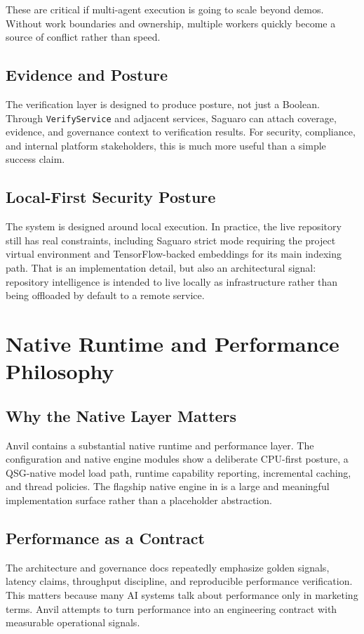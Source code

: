 \documentclass[11pt,a4paper]{article}
\begin{document}
These are critical if multi-agent execution is going to scale beyond demos. Without work boundaries and ownership, multiple workers quickly become a source of conflict rather than speed.

\subsection{Evidence and Posture}
The verification layer is designed to produce posture, not just a Boolean. Through \texttt{VerifyService} and adjacent services, Saguaro can attach coverage, evidence, and governance context to verification results. For security, compliance, and internal platform stakeholders, this is much more useful than a simple success claim.

\subsection{Local-First Security Posture}
The system is designed around local execution. In practice, the live repository still has real constraints, including Saguaro strict mode requiring the project virtual environment and TensorFlow-backed embeddings for its main indexing path. That is an implementation detail, but also an architectural signal: repository intelligence is intended to live locally as infrastructure rather than being offloaded by default to a remote service.

\section{Native Runtime and Performance Philosophy}
\subsection{Why the Native Layer Matters}
Anvil contains a substantial native runtime and performance layer. The configuration and native engine modules show a deliberate CPU-first posture, a QSG-native model load path, runtime capability reporting, incremental caching, and thread policies. The flagship native engine in  is a large and meaningful implementation surface rather than a placeholder abstraction.

\subsection{Performance as a Contract}
The architecture and governance docs repeatedly emphasize golden signals, latency claims, throughput discipline, and reproducible performance verification. This matters because many AI systems talk about performance only in marketing terms. Anvil attempts to turn performance into an engineering contract with measurable operational signals.
\end{document}
